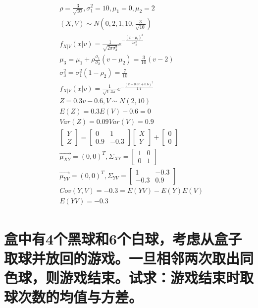 \documentclass[UTF8]{ctexart}
\begin{document}
\begin{equation*}
\begin{aligned}
&\rho=\frac{3}{\sqrt{10}},\sigma_1^2=10,\mu_1=0,\mu_2=2\\
&(X,V)\sim N(0,2,1,10,\frac{3}{\sqrt{10}})\\
&f_{X\lvert V}(x\lvert v)=\frac{1}{\sqrt{2\pi\sigma_3^2}}e^{-\frac{(x-\mu_3)^2}{2\sigma_3^2}}\\
&\mu_3=\mu_1+\rho\frac{\sigma_1}{\sigma_2}(v-\mu_2)=\frac{3}{10}(v-2)\\
&\sigma_3^2=\sigma_1^2(1-\rho_2)=\frac{7}{10}\\
&f_{X\lvert V}(x\lvert v)=\frac{1}{\sqrt{1.4\pi}}e^{-\frac{(x-0.3v+0.6)^2}{1.4}}\\
&Z=0.3v-0.6,V\sim N(2,10)\\
&E(Z)=0.3E(V)-0.6=0\\
&Var(Z)=0.09Var(V)=0.9\\
&\begin{bmatrix}Y\\Z\end{bmatrix}=\begin{bmatrix}0&1\\0.9&-0.3\end{bmatrix}\begin{bmatrix}X\\Y\end{bmatrix}+\begin{bmatrix}0\\0\end{bmatrix}\\
&\vec{\mu_{XY}}=(0,0)^T,\Sigma_{XY}=\begin{bmatrix}1&0\\0&1\end{bmatrix}\\
&\vec{\mu_{YV}}=(0,0)^T,\Sigma_{YV}=\begin{bmatrix}1&-0.3\\-0.3&0.9\end{bmatrix}\\
&Cov(Y,V)=-0.3=E(YV)-E(Y)E(V)\\
&E(YV)=-0.3\\
\end{aligned}
\end{equation*}
\section{盒中有4个黑球和6个白球，考虑从盒子取球并放回的游戏。一旦相邻两次取出同色球，则游戏结束。试求：游戏结束时取球次数的均值与方差。}
\end{document}
